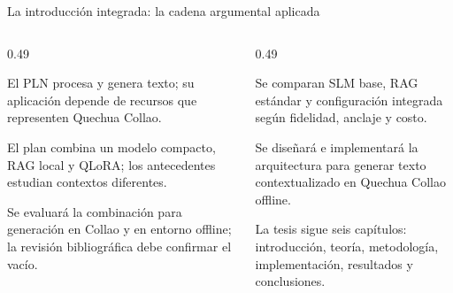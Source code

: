 \documentclass[aspectratio=169,10pt,spanish]{beamer}
\begin{document}
\begin{frame}{La introducción integrada: la cadena argumental aplicada}
    \begin{columns}[T,onlytextwidth]
        \begin{column}{0.49\textwidth}
            \begin{tcolorbox}[colback=bpRust!5,colframe=bpRust,title=\textbf{1. Contexto},fonttitle=\small\bfseries,top=0.8mm,bottom=0.8mm]
                \scriptsize El PLN procesa y genera texto; su aplicación depende de recursos que representen Quechua Collao.
            \end{tcolorbox}
            \begin{tcolorbox}[colback=bpGold!7,colframe=bpGold!90!black,title=\textbf{2. Tecnología y evidencia},fonttitle=\small\bfseries,top=0.8mm,bottom=0.8mm]
                \scriptsize El plan combina un modelo compacto, RAG local y QLoRA; los antecedentes estudian contextos diferentes.
            \end{tcolorbox}
            \begin{tcolorbox}[colback=bpBlue!5,colframe=bpBlue,title=\textbf{3. Vacío provisional},fonttitle=\small\bfseries,top=0.8mm,bottom=0.8mm]
                \scriptsize Se evaluará la combinación para generación en Collao y en entorno offline; la revisión bibliográfica debe confirmar el vacío.
            \end{tcolorbox}
        \end{column}
        \begin{column}{0.49\textwidth}
            \begin{tcolorbox}[colback=bpRust!5,colframe=bpRust,title=\textbf{4. Problema},fonttitle=\small\bfseries,top=0.8mm,bottom=0.8mm]
                \scriptsize Se comparan SLM base, RAG estándar y configuración integrada según fidelidad, anclaje y costo.
            \end{tcolorbox}
            \begin{tcolorbox}[colback=bpBlue!5,colframe=bpBlue,title=\textbf{5. Propuesta y valor},fonttitle=\small\bfseries,top=0.8mm,bottom=0.8mm]
                \scriptsize Se diseñará e implementará la arquitectura para generar texto contextualizado en Quechua Collao offline.
            \end{tcolorbox}
            \begin{tcolorbox}[colback=bpGreen!5,colframe=bpGreen,title=\textbf{6. Organización},fonttitle=\small\bfseries,top=0.8mm,bottom=0.8mm]
                \scriptsize La tesis sigue seis capítulos: introducción, teoría, metodología, implementación, resultados y conclusiones.
            \end{tcolorbox}
        \end{column}
    \end{columns}
\end{frame}
\end{document}
